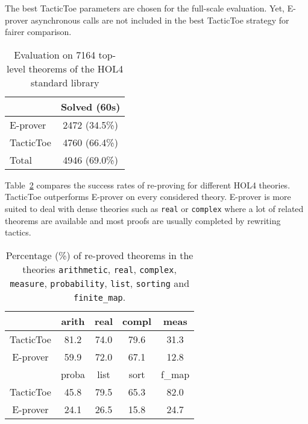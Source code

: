 \documentclass[runningheads,a4paper,draft]{svjour3}
\def\holfour{\textsf{HOL4}\xspace}
\def\eprover{\textsf{E-prover}\xspace}
\def\tactictoe{\textsf{TacticToe}\xspace}
\newcommand{\ra}[1]{\renewcommand{\arraystretch}{#1}}
\begin{document}
The best \tactictoe parameters are chosen for the full-scale evaluation. Yet,
\eprover asynchronous calls are not included in the best \tactictoe strategy
for fairer comparison.


\begin{table}[h!]
\centering\ra{1.3}
\small
\begin{tabular}{lc}
\toprule
  & Solved (60s) \\
\midrule
   \eprover   & 2472 (34.5\%)\\
   \tactictoe & 4760 (66.4\%)\\
\midrule
   Total  & 4946 (69.0\%)\\
\bottomrule
\end{tabular}
\caption{Evaluation on 7164 top-level theorems of the \holfour standard library
\label{tab:_param}}
\end{table}

Table~\ref{theories} compares the success rates of re-proving for different
\holfour theories. \tactictoe outperforms \eprover on every
considered theory.
\eprover is more suited to deal with dense theories such as
\texttt{real} or \texttt{complex} where a lot of related theorems are available
and most proofs are usually completed by rewriting tactics.

\begin{table}[]
\centering
\setlength{\tabcolsep}{3mm}
\begin{tabular}{@{}ccccc@{}}
\toprule
\phantom{ab} & {arith} & {real} & {compl} & {meas} \\
\midrule
\tactictoe & 81.2 & 74.0 & 79.6 & 31.3\\
\eprover & 59.9 & 72.0 & 67.1 & 12.8\\
\midrule
\phantom{abc} & {proba} & {list} & {sort} & {f\_map} \\
\midrule
\tactictoe & 45.8 & 79.5 & 65.3 & 82.0 \\
\eprover & 24.1 & 26.5 & 15.8 & 24.7 \\
\bottomrule
\end{tabular}
\caption{\label{theories}Percentage (\%) of re-proved theorems in the theories
\texttt{arithmetic}, \texttt{real}, \texttt{complex}, \texttt{measure},
\texttt{probability}, \texttt{list}, \texttt{sorting} and \texttt{finite\_map}.
}
\end{table}



\end{document}
